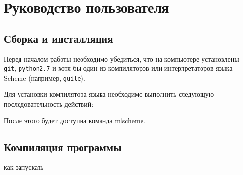 \section{Руководство пользователя}
    \subsection{Сборка и инсталляция}

    Перед началом работы необходимо убедиться, что на компьютере установлены \verb,git,, \verb,python2.7, и хотя бы один из компиляторов или интерпретаторов языка Scheme (например, \verb,guile,).

    Для установки компилятора языка необходимо выполнить следующую последовательность действий:

    

    После этого будет доступна команда mlscheme.
    \subsection{Компиляция программы}
        как запускать
